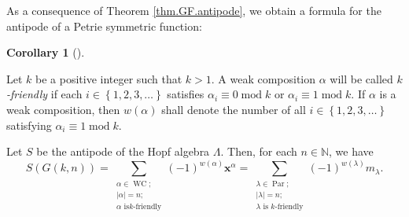 \documentclass[numbers=enddot,12pt,final,onecolumn,notitlepage]{scrartcl}%
\theoremstyle{definition}
\newtheorem{coro}[theo]{Corollary}
\newenvironment{corollary}[1][]
{\begin{coro}[#1]\begin{leftbar}}
{\end{leftbar}\end{coro}}
\let\sumnonlimits\sum
\renewcommand{\sum}{\sumnonlimits\limits}
\begin{document}
As a consequence of Theorem \ref{thm.GF.antipode}, we obtain a formula for the
antipode of a Petrie symmetric function:

\begin{corollary}
\label{cor.Gkm.antipode}Let $k$ be a positive integer such that $k>1$. A weak
composition $\alpha$ will be called $k$\emph{-friendly} if each $i\in\left\{
1,2,3,\ldots\right\}  $ satisfies $\alpha_{i}\equiv0\operatorname{mod}k$ or
$\alpha_{i}\equiv1\operatorname{mod}k$. If $\alpha$ is a weak composition,
then $w\left(  \alpha\right)  $ shall denote the number of all $i\in\left\{
1,2,3,\ldots\right\}  $ satisfying $\alpha_{i}\equiv1\operatorname{mod}k$.

Let $S$ be the antipode of the Hopf algebra $\Lambda$. Then, for each
$n\in\mathbb{N}$, we have%
\[
S\left(  G\left(  k,n\right)  \right)  =\sum_{\substack{\alpha\in
\operatorname*{WC};\\\left\vert \alpha\right\vert =n;\\\alpha\text{ is
}k\text{-friendly}}}\left(  -1\right)  ^{w\left(  \alpha\right)  }%
\mathbf{x}^{\alpha}=\sum_{\substack{\lambda\in\operatorname*{Par};\\\left\vert
\lambda\right\vert =n;\\\lambda\text{ is }k\text{-friendly}}}\left(
-1\right)  ^{w\left(  \lambda\right)  }m_{\lambda}.
\]

\end{corollary}
\end{document}
